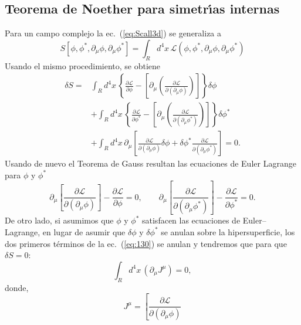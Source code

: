 \subsection{Teorema de Noether para simetr\'\i as internas}
\begin{frame}
Para un campo complejo la ec.~(\ref{eq:Scall3d}) se generaliza a
\begin{equation}
  S[\phi,\phi^*,\partial_\mu\phi,\partial_\mu\phi^*]=\int_{R}d^4x\,\mathcal{L}(\phi,\phi^*,\partial_\mu\phi,\partial_\mu\phi^*)
\end{equation}
Usando el mismo procedimiento, se obtiene
\begin{align}
  \label{eq:130}
   \delta S=&\int_{R}d^4x\,
  \left\{ 
    \frac{\partial\mathcal{L}}{\partial\phi}-
  \left[\partial_\mu\left(
      \frac{\partial\mathcal{L}}{\partial(\partial_\mu\phi)}
    \right)\right]
  \right\}\delta\phi \nonumber\\
&+\int_{R}d^4x\,
  \left\{ 
    \frac{\partial\mathcal{L}}{\partial\phi^*}-
  \left[\partial_\mu\left(
      \frac{\partial\mathcal{L}}{\partial(\partial_\mu\phi^*)}
    \right)\right]
  \right\}\delta\phi^*\nonumber\\
&+\int_{R}d^4x\,
    \partial_\mu\left[
      \frac{\partial\mathcal{L}}{\partial(\partial_\mu\phi)}\delta\phi+
      \delta\phi^*\frac{\partial\mathcal{L}}{\partial(\partial_\mu\phi^*)}
    \right]=0.
\end{align}
Usando de nuevo el Teorema de Gauss resultan las ecuaciones de Euler Lagrange para $\phi$ y $\phi^*$
\begin{equation}
\label{eq:132}
  \partial_\mu
  \left[
    \frac{\partial\mathcal{L}}{\partial
      (\partial_\mu\phi)}
  \right]-\frac{\partial\mathcal{L}}{\partial\phi}=0, \qquad
  \partial_\mu
  \left[
    \frac{\partial\mathcal{L}}{\partial
      (\partial_\mu\phi^*)}
  \right]-\frac{\partial\mathcal{L}}{\partial\phi^*}=0.
\end{equation}
De otro lado, si asumimos que $\phi$ y $\phi^*$ satisfacen las ecuaciones de Euler--Lagrange, en lugar de asumir que $\delta\phi$ y $\delta\phi^*$ se anulan sobre la hipersuperficie, los dos primeros t\'erminos de la ec.~(\ref{eq:130}) se anulan y tendremos que para que $\delta S=0$:
\begin{equation}
  \label{eq:jmu}
  \int_{R}d^4x\,(\partial_\mu J^\mu)=0,
\end{equation}
donde,
\begin{equation}
  \label{eq:jmuphi}
 J^\mu= \left[
      \frac{\partial\mathcal{L}}{\partial(\partial_\mu\phi)}

\end{equation}
\end{frame}
